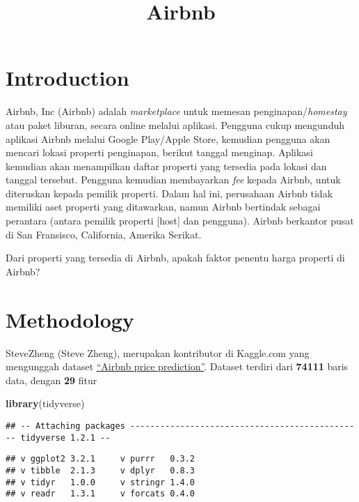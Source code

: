 \documentclass[]{article}
\title{Airbnb}
\author{}
\date{}
\newenvironment{Shaded}{\begin{snugshade}}{\end{snugshade}}
\newcommand{\KeywordTok}[1]{\textcolor[rgb]{0.13,0.29,0.53}{\textbf{#1}}}
\newcommand{\NormalTok}[1]{#1}
\begin{document}
\maketitle

\hypertarget{introduction}{%
\section{Introduction}\label{introduction}}

Airbnb, Inc (Airbnb) adalah \emph{marketplace} untuk memesan
penginapan/\emph{homestay} atau paket liburan, secara online melalui
aplikasi. Pengguna cukup mengunduh aplikasi Airbnb melalui Google
Play/Apple Store, kemudian pengguna akan mencari lokasi properti
penginapan, berikut tanggal menginap. Aplikasi kemudian akan menampilkan
daftar properti yang tersedia pada lokasi dan tanggal tersebut. Pengguna
kemudian membayarkan \emph{fee} kepada Airbnb, untuk diteruskan kepada
pemilik properti. Dalam hal ini, perusahaan Airbnb tidak memiliki aset
properti yang ditawarkan, namun Airbnb bertindak sebagai perantara
(antara pemilik properti {[}host{]} dan pengguna). Airbnb berkantor
pusat di San Fransisco, California, Amerika Serikat.

Dari properti yang tersedia di Airbnb, apakah faktor penentu harga
properti di Airbnb?

\hypertarget{methodology}{%
\section{Methodology}\label{methodology}}

SteveZheng (Steve Zheng), merupakan kontributor di Kaggle.com yang
mengunggah dataset
\href{https://www.kaggle.com/stevezhenghp/airbnb-price-prediction}{``Airbnb
price prediction''}. Dataset terdiri dari \textbf{74111} baris data,
dengan \textbf{29} fitur

\begin{Shaded}
\begin{Highlighting}[]
\KeywordTok{library}\NormalTok{(tidyverse)}
\end{Highlighting}
\end{Shaded}

\begin{verbatim}
## -- Attaching packages ----------------------------------------------- tidyverse 1.2.1 --
\end{verbatim}

\begin{verbatim}
## v ggplot2 3.2.1     v purrr   0.3.2
## v tibble  2.1.3     v dplyr   0.8.3
## v tidyr   1.0.0     v stringr 1.4.0
## v readr   1.3.1     v forcats 0.4.0
\end{verbatim}
\end{document}
